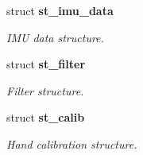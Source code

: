 \begin{DoxyCompactItemize}
struct \textbf{ st\+\_\+imu\+\_\+data}
\begin{DoxyCompactList}\small\item\em I\+MU data structure. \end{DoxyCompactList}\item 
struct \textbf{ st\+\_\+filter}
\begin{DoxyCompactList}\small\item\em Filter structure. \end{DoxyCompactList}\item 
struct \textbf{ st\+\_\+calib}
\begin{DoxyCompactList}\small\item\em Hand calibration structure. \end{DoxyCompactList}\end{DoxyCompactItemize}
